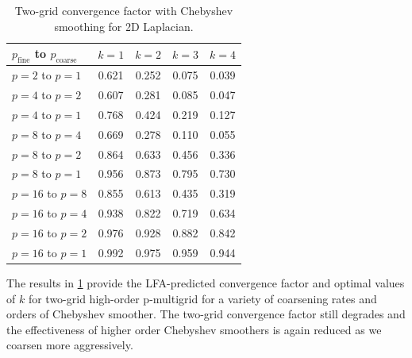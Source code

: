 \documentclass[review]{siamart190516}
\begin{document}
\begin{table}[ht!]
\begin{center}
\begin{tabular}{l c c c c}
  \toprule
  $p_{\text{fine}}$ to $p_{\text{coarse}}$  &  $k = 1$   &  $k = 2$   &  $k = 3$   &  $k = 4$   \\
  \toprule
  $p = 2$ to $p = 1$   &  0.621  &  0.252  &  0.075  &  0.039  \\
  \midrule
  $p = 4$ to $p = 2$   &  0.607  &  0.281  &  0.085  &  0.047  \\
  $p = 4$ to $p = 1$   &  0.768  &  0.424  &  0.219  &  0.127  \\
  \midrule
  $p = 8$ to $p = 4$   &  0.669  &  0.278  &  0.110  &  0.055  \\
  $p = 8$ to $p = 2$   &  0.864  &  0.633  &  0.456  &  0.336  \\
  $p = 8$ to $p = 1$   &  0.956  &  0.873  &  0.795  &  0.730  \\
  \midrule
  $p = 16$ to $p = 8$  &  0.855  &  0.613  &  0.435  &  0.319  \\
  $p = 16$ to $p = 4$  &  0.938  &  0.822  &  0.719  &  0.634  \\
  $p = 16$ to $p = 2$  &  0.976  &  0.928  &  0.882  &  0.842  \\
  $p = 16$ to $p = 1$  &  0.992  &  0.975  &  0.959  &  0.944  \\
  \bottomrule
\end{tabular}
\end{center}
\caption{Two-grid convergence factor with Chebyshev smoothing for 2D Laplacian.}
\label{table:two_grid_2d_chebyshev}
\end{table}

The results in \cref{table:two_grid_2d_chebyshev} provide the LFA-predicted convergence factor and optimal values of $k$ for two-grid high-order p-multigrid for a variety of coarsening rates and orders of Chebyshev smoother.
The two-grid convergence factor still degrades and the effectiveness of higher order Chebyshev smoothers is again reduced as we coarsen more aggressively.
\end{document}
